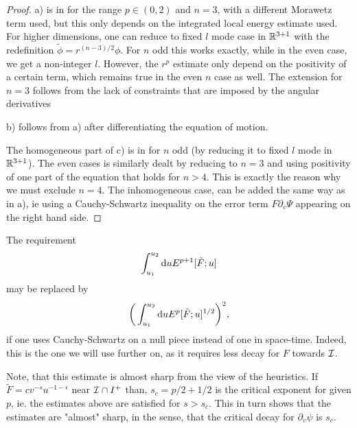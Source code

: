\documentclass[11pt, oneside]{amsart}
\begin{document}
\begin{proof}
	a) is in \cite{yang_global_2013-1} for the range $p\in(0,2)$ and $n=3$, with a different Morawetz term used, but this only depends on the integrated local energy estimate used. For higher dimensions, one can reduce to fixed $l$ mode case in $\mathbb{R}^{3+1}$  with the redefinition $\tilde{\phi}=r^{(n-3)/2}\phi$. For $n$ odd this works exactly, while in the even case, we get a non-integer $l$. However, the $r^p$ estimate only depend on the positivity of a certain term, which remains true in the even $n$ case as well. The extension for $n=3$ follows from the lack of constraints that are imposed by the angular derivatives 
	
	b) follows from a) after differentiating the equation of motion. 
	
	The homogeneous part of c) is in \cite{angelopoulos_vector_2018} for $n$ odd (by reducing it to fixed $l$ mode in $\mathbb{R}^{3+1}$). The even cases is similarly dealt by reducing to $n=3$ and using positivity of one part of the equation that holds for $n>4$. This is exactly the reason why we must exclude $n=4$. The inhomogeneous case, can be added the same way as in a), ie using a Cauchy-Schwartz inequality on the error term $F\partial_v\Psi$ appearing on the right hand side.
\end{proof}
\begin{remark}
	The requirement
	\begin{equation*}
		\begin{gathered}
			\int_{u_1}^{u_2}\mathrm{d} u E^{p+1}[\tilde{F};u]
		\end{gathered}
	\end{equation*}
	may be replaced by
	\begin{equation*}
		\begin{gathered}
			\bigg(\int_{u_1}^{u_2}\mathrm{d} u E^{p}[\tilde{F};u]^{1/2}\bigg)^2,
		\end{gathered}
	\end{equation*}
	if one uses Cauchy-Schwartz on a null piece instead of one in space-time. Indeed, this is the one we will use further on, as it requires less decay for $F$ towards $\mathcal{I}$.
\end{remark}
\begin{remark}
	Note, that this estimate is almost sharp from the view of the heuristics. If $\tilde{F}=cv^{-s}u^{-1-\epsilon}$ near $\mathcal{I}\cap I^+$ than, $s_c=p/2+1/2$ is the critical exponent for given $p$, ie. the estimates above are satisfied for $s>s_c$. This in turn shows that the estimates are "almost" sharp, in the sense, that the critical decay for $\partial_v\psi$ is $s_c$.
\end{remark}
\end{document}
